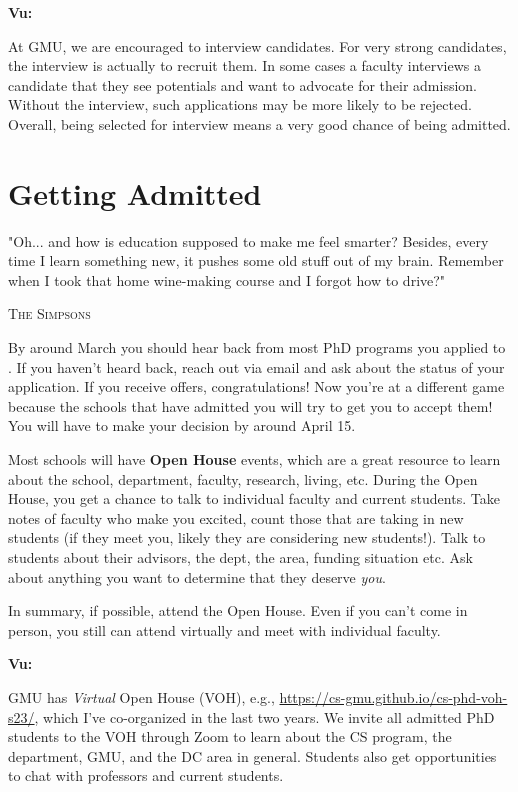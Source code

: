 \documentclass[11pt]{article}
\newenvironment{commentbox}[1][]{
\small
    \begin{cbox}
    \textbf{#1} 
 }{
   \end{cbox}
}
\begin{document}
\begin{commentbox}[Vu:]
At GMU, we are encouraged to interview candidates. For very strong candidates, the interview is actually to recruit them.  In some cases a faculty interviews a candidate that they see potentials and want to advocate for their admission. Without the interview, such applications may be more likely to be rejected. Overall, being selected for interview means a very good chance of being admitted.
\end{commentbox}

\section{Getting Admitted}\label{sec:accepted}

\epigraph{"Oh... and how is education supposed to make me feel smarter? Besides, every time I learn something new, it pushes some old stuff out of my brain. Remember when I took that home wine-making course and I forgot how to drive?"}{\textsc{The Simpsons}}

By around March you should hear back from most PhD programs you applied to . If you haven't heard back, reach out via email and ask about the status of your application.
If you receive offers, congratulations!  Now you're at a different game because the schools that have admitted you will try to get you to accept them!   You will have to make your decision by around April 15.

Most schools will have \textbf{Open House} events, which are a great resource to learn about the school, department, faculty, research, living, etc. During the Open House, you get a chance to talk to individual faculty and current students.  Take notes of faculty who make you excited, count those that are taking in new students (if they meet you, likely they are considering new students!).  Talk to students about their advisors, the dept, the area, funding situation etc.  Ask about anything you want to determine that they deserve \emph{you}.

In summary, if possible, attend the Open House.  Even if you can't come in person, you still can attend virtually and meet with individual faculty.

\begin{commentbox}[Vu:]
GMU has \emph{Virtual} Open House (VOH), e.g., \url{https://cs-gmu.github.io/cs-phd-voh-s23/}, which I've co-organized in the last two years. We invite all admitted PhD students to the VOH through Zoom to learn about the CS program, the department, GMU, and the DC area in general. Students also get opportunities to chat with professors and current students.
\end{commentbox}
\end{document}
